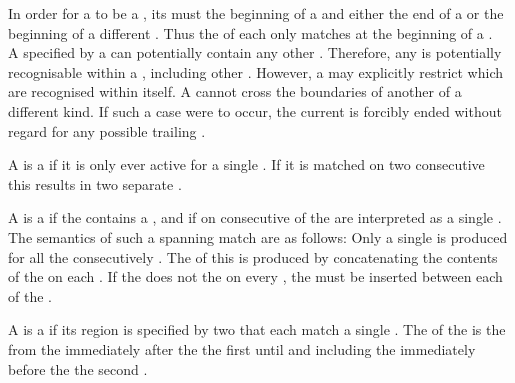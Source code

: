 In order for a  to be a , its  must  the beginning of a  and either the end of a  or the beginning of a different . Thus the  of each  only matches at the beginning of a .\\

A  specified by a  can potentially contain any other . Therefore, any  is potentially recognisable within a , including other . However, a  may explicitly restrict which  are recognised within itself. A  cannot cross the boundaries of another  of a different kind. If such a case were to occur, the current  is forcibly ended without regard for any possible trailing .

A  is a  if it is only ever active for a single . If it is matched on two consecutive  this results in two separate .

A  is a  if the  contains a , and if  on consecutive  of the  are interpreted as a single . The semantics of such a spanning match are as follows: Only a single  is produced for all the consecutively  . The  of this  is produced by concatenating the contents of the  on each . If the  does not  the  on every , the  must be inserted between each  of the .

A  is a  if its  region is specified by two  that each match a single . The  of the  is the  from the  immediately after the  the first   until and including the  immediately before the  the second  .











